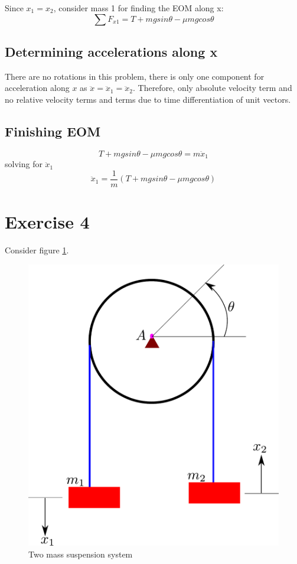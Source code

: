 Since $x_{1} = x_{2}$, consider mass 1 for finding the EOM along x:
\begin{equation}
	\sum F_{x1} = T + mgsin\theta - \mu mg cos\theta
\end{equation}

\subsection{Determining accelerations along x}

There are no rotations in this problem, there is only one component for acceleration along $x$ as $\ddot{x} = \ddot{x}_{1} = \ddot{x}_{2}$. Therefore, only absolute velocity term and no relative velocity terms and terms due to time differentiation of unit vectors.

\subsection{Finishing EOM}

\begin{equation}
	T + mgsin\theta - \mu mg cos\theta = m \ddot{x}_{1}
\end{equation}
solving for $\ddot{x}_{1}$
\begin{equation}
	\ddot{x}_{1} = \frac{1}{m}\left(T + mgsin\theta - \mu mg cos\theta\right)
\end{equation}

\section{Exercise 4}

Consider figure \ref{fig_0_ch_4_twoMassSuspension}.
\begin{figure}[h!]
	\centering
	\includegraphics[width=0.5\linewidth]{Bilder/25_TwoMassSuspension.pdf}
	\caption{Two mass suspension system}
	\label{fig_0_ch_4_twoMassSuspension}
\end{figure}

